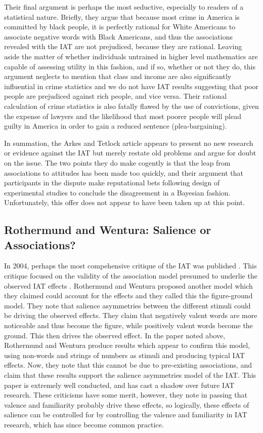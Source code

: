 Their final argument is perhaps the most seductive, especially to readers of a statistical nature. Briefly, they argue that because most crime in America is committed by black people, it is perfectly rational for White Americans to associate negative words with Black Americans, and thus the associations revealed with the IAT are not prejudiced, because they are rational. Leaving aside the matter of whether individuals untrained in higher level mathematics are capable of assessing utility in this fashion, and if so, whether or not they do, this argument neglects to mention that class and income are also significantly influential in crime statistics and we do not have IAT results suggesting that poor people are prejudiced against rich people, and vice versa. Their rational calculation of crime statistics is also fatally flawed by the use of convictions, given the expense of lawyers and the likelihood that most poorer people will plead guilty in America in order to gain a reduced sentence (plea-bargaining). 

In summation, the Arkes and Tetlock article appears to present no new research or evidence against the IAT but merely restate old problems and argue for doubt on the issue. The two points they do make cogently is that the leap from associations to attitudes has been made too quickly, and their argument that participants in the dispute make reputational bets following design of experimental studies to conclude the disagreement in a Bayesian fashion. Unfortunately, this offer does not appear to have been taken up at this point. 

\subsection{Rothermund and Wentura: Salience or Associations?}

In 2004, perhaps the most compehensive critique of the IAT was published \cite{Rothermund2004}. This critique focused on the validity of the association model presumed to underlie the observed IAT effects \cite{Greenwald1998}. Rothermund and Wentura proposed another model which they claimed could account for the effects and they called this the figure-ground model. They note that salience asymmetries between the different stimuli could be driving the observed effects. They claim that negatively valent words are more noticeable and thus become the figure, while positively valent words become the ground. This then drives  the observed  effect. In the paper noted above, Rothermund and Wentura produce results which appear to confirm this model, using non-words and strings of numbers as stimuli and producing typical IAT effects. Now, they note that this cannot be due to pre-existing associations, and claim that these results support the salience asymmetries model of the IAT. This paper is extremely well conducted, and has  cast a shadow over future IAT research. These criticisms have some merit, however, they note in passing that valence and familiarity probably drive these effects, so logically, these effects of salience can be controlled for by controlling the valence and familiarity in IAT research, which has since become common practice. 

